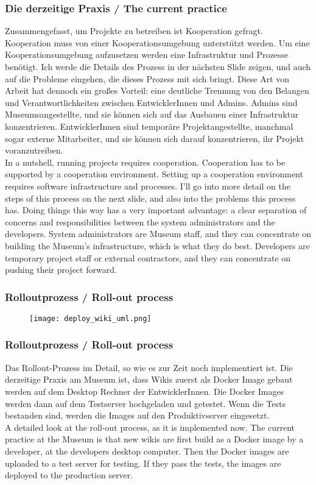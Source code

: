 \documentclass[12pt]{beamer}
\begin{document}
{\scriptsize
\begin{frame}
  \frametitle{Die derzeitige Praxis / \textcolor{mfn_green}{The current practice}}
  Zusammengefasst, um Projekte zu betreiben ist Kooperation gefragt. Kooperation muss von einer Kooperationsumgebung unterstützt werden. Um eine Kooperationsumgebung aufzusetzen werden eine Infrastruktur und Prozesse benötigt. Ich werde die Details des Prozess in der nächsten Slide zeigen, und auch auf die Probleme eingehen, die dieses Prozess mit sich bringt. Diese Art von Arbeit hat dennoch ein großes Vorteil: eine deutliche Trennung von den Belangen und Verantwortlichkeiten zwischen EntwicklerInnen und Admins. Admins sind Museumsangestellte, und sie können sich auf das Ausbauen einer Infrastruktur konzentrieren. EntwicklerInnen sind temporäre Projektangestellte, manchmal sogar externe Mitarbeiter, und sie können sich darauf konzentrieren, ihr Projekt voranzutreiben.\\
  \bigskip
  \textcolor{mfn_green}{In a nutshell, running projects requires cooperation. Cooperation has to be supported by a cooperation environment. Setting up a cooperation environment requires software infrastructure and processes. I'll go into more detail on the steps of this process on the next slide, and also into the problems this process has. Doing things this way has a very important advantage: a clear separation of concerns and responsibilities between the system administrators and the developers. System administrators are Museum staff, and they can concentrate on building the Museum's infrastructure, which is what they do best. Developers are temporary project staff or external contractors, and they can concentrate on pushing their project forward.}
\end{frame}
}
\begin{frame}
  \frametitle{Rolloutprozess / \textcolor{mfn_green}{Roll-out process}}
  \begin{figure}
    \texttt{[image: deploy\_wiki\_uml.png]}
  \end{figure}
\end{frame}

{\scriptsize
\begin{frame}
  \frametitle{Rolloutprozess / \textcolor{mfn_green}{Roll-out process}}
  Das Rollout-Prozess im Detail, so wie es zur Zeit noch implementiert ist. Die derzeitige Praxis am Museum ist, dass Wikis zuerst als Docker Image gebaut werden auf dem Desktop Rechner der EntwicklerInnen. Die Docker Images werden dann auf dem Testserver hochgeladen und getestet. Wenn die Tests bestanden sind, werden die Images auf den Produktivserver eingesetzt.\\
  \bigskip
  \textcolor{mfn_green}{A detailed look at the roll-out process, as it is implemented now. The current practice at the Museum is that new wikis are first build as a Docker image by a developer, at the developers desktop computer. Then the Docker images are uploaded to a test server for testing. If they pass the tests, the images are deployed to the production server.}
\end{frame}
}
%
%
\end{document}
